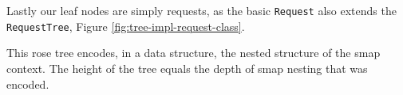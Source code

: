 Lastly our leaf nodes are simply requests, as the basic \texttt{Request} also extends the \texttt{RequestTree}, Figure \ref{fig:tree-impl-request-class}.

This rose tree encodes, in a data structure, the nested structure of the smap context.
The height of the tree equals the depth of smap nesting that was encoded.

